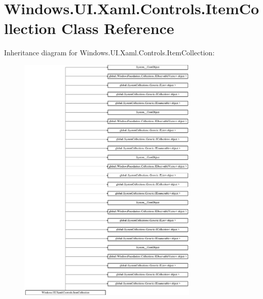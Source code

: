 \hypertarget{class_windows_1_1_u_i_1_1_xaml_1_1_controls_1_1_item_collection}{}\section{Windows.\+U\+I.\+Xaml.\+Controls.\+Item\+Collection Class Reference}
\label{class_windows_1_1_u_i_1_1_xaml_1_1_controls_1_1_item_collection}
Inheritance diagram for Windows.\+U\+I.\+Xaml.\+Controls.\+Item\+Collection\+:\begin{figure}[H]
\begin{center}
\leavevmode
\includegraphics[height=12.000000cm]{class_windows_1_1_u_i_1_1_xaml_1_1_controls_1_1_item_collection}
\end{center}
\end{figure}
